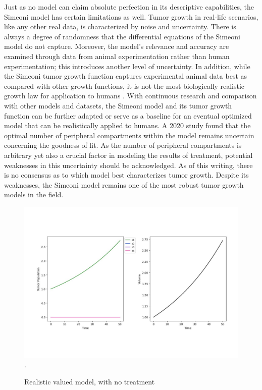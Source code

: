 \documentclass[11pt,reqno]{amsart}
\begin{document}
Just as no model can claim absolute perfection in its descriptive capabilities, the Simeoni model has certain limitations as well. Tumor growth in real-life scenarios, like any other real data, is characterized by noise and uncertainty. There is always a degree of randomness that the differential equations of the Simeoni model do not capture. Moreover, the model’s relevance and accuracy are examined through data from animal experimentation rather than human experimentation; this introduces another level of uncertainty. In addition, while the Simeoni tumor growth function captures experimental animal data best as compared with other growth functions, it is not the most biologically realistic growth law for application to humans \cite{Koziol_Falls_Schnitzer_2020}. With continuous research and comparison with other models and datasets, the Simeoni model and its tumor growth function can be further adapted or serve as a baseline for an eventual optimized model that can be realistically applied to humans. A 2020 study \cite{Koziol_Falls_Schnitzer_2020} found that the optimal number of peripheral compartments within the model remains uncertain concerning the goodness of fit. As the number of peripheral compartments is arbitrary yet also a crucial factor in modeling the results of treatment, potential weaknesses in this uncertainty should be acknowledged. As of this writing, there is no consensus as to which model best characterizes tumor growth. Despite its weaknesses, the Simeoni model remains one of the most robust tumor growth models in the field. 

\begin{figure}[h]
\begin{center} %
\includegraphics[width=\textwidth]{parameters_like_paper_no_treatment.pdf}. %
\end{center}
\caption{Realistic valued model, with no treatment}
\label{fig:3}
\end{figure}
\end{document}
